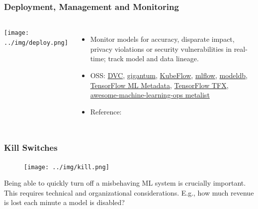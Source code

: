 \documentclass[11pt,
               aspectratio=169,
               hyperref={colorlinks}
               ]{beamer}
\begin{document}
			\begin{frame}
	
				\frametitle{Deployment, Management and Monitoring}		
				
				\begin{columns}
		
					\centering
					\texttt{[image: ../img/deploy.png]}
					
					\vspace{-5pt}
					\begin{itemize}
						\item Monitor models for accuracy, disparate impact, privacy violations or security vulnerabilities in real-time; track model and data lineage.
						\item OSS: 
						\href{https://dvc.org/}{DVC},
						\href{https://gigantum.com/}{gigantum}, 
						\href{https://www.kubeflow.org/docs/pipelines/overview/pipelines-overview/}{KubeFlow},
						\href{https://github.com/mlflow/mlflow}{mlflow}, 
						\href{https://github.com/mitdbg/modeldb}{modeldb},
						\href{link:https://www.tensorflow.org/tfx/guide/mlmd}{TensorFlow ML Metadata}, 
						\href{https://www.tensorflow.org/tfx}{TensorFlow TFX},
						\href{https://github.com/EthicalML/awesome-machine-learning-operations}{awesome-machine-learning-ops metalist}
						\item Reference: 
					\end{itemize}
					
				\end{columns}
			
			\end{frame}

			\begin{frame}
	
				\frametitle{Kill Switches}	
				
				\begin{figure}[htb]
					\begin{center}
						\texttt{[image: ../img/kill.png]}
					\end{center}
				\end{figure}	
				
				\vspace{-10pt}
				\scriptsize{Being able to quickly turn off a misbehaving ML system is crucially important. This requires technical and organizational considerations. E.g., how much revenue is lost each minute a model is disabled?}	
				
				
			\end{frame}
	
\end{document}
